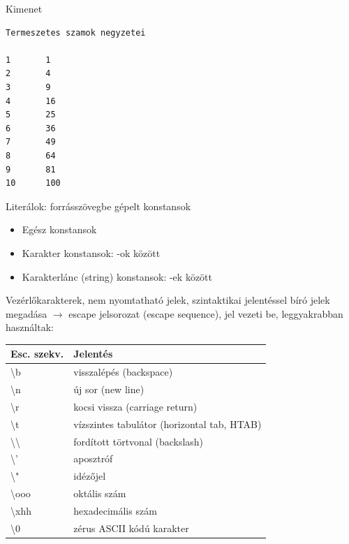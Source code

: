 \documentclass[usenames,dvipsnames,aspectratio=169]{beamer}
\begin{document}
\begin{frame}
  \footnotesize
  \begin{exampleblock}{}
      \vspace{-.3cm}
      
      \vspace{-.3cm}
  \end{exampleblock}
\end{frame}

\begin{frame}[fragile]
  \footnotesize
  \begin{block}{Kimenet}
    \vspace{-.3cm}
    \begin{verbatim}
Termeszetes szamok negyzetei

1       1
2       4
3       9
4       16
5       25
6       36
7       49
8       64
9       81
10      100
    \end{verbatim}
    \vspace{-.5cm}
  \end{block}
\end{frame}

\begin{frame}[fragile]
  \small
  Literálok: forrásszövegbe gépelt konstansok
  \footnotesize
  \begin{itemize}
    \item Egész konstansok
    \item Karakter konstansok: -ok között
    \item Karakterlánc (string) konstansok: -ek között
  \end{itemize}
  \small
  Vezérlőkarakterek, nem nyomtatható jelek, szintaktikai jelentéssel bíró jelek megadása $\rightarrow$ escape jelsorozat 
(escape sequence), \kiemel{\textbackslash} jel vezeti be, leggyakrabban használtak:
  \footnotesize
  \begin{center}
    \begin{tabular}{ll}
      Esc. szekv. & Jelentés\\ \hline
      \textbackslash{b} & visszalépés (backspace)\\
      \textbackslash{n} & új sor (new line)\\
      \textbackslash{r} & kocsi vissza (carriage return)\\
      \textbackslash{t} & vízszintes tabulátor (horizontal tab, HTAB)\\
      \textbackslash{\textbackslash} & fordított törtvonal (backslash)\\
      \textbackslash{'} & aposztróf\\
      \textbackslash{"} & idézőjel\\
      \textbackslash{ooo} & oktális szám\\
      \textbackslash{xhh} & hexadecimális szám\\
      \textbackslash{0} & zérus ASCII kódú karakter
    \end{tabular}
  \end{center}
\end{frame}
\end{document}
